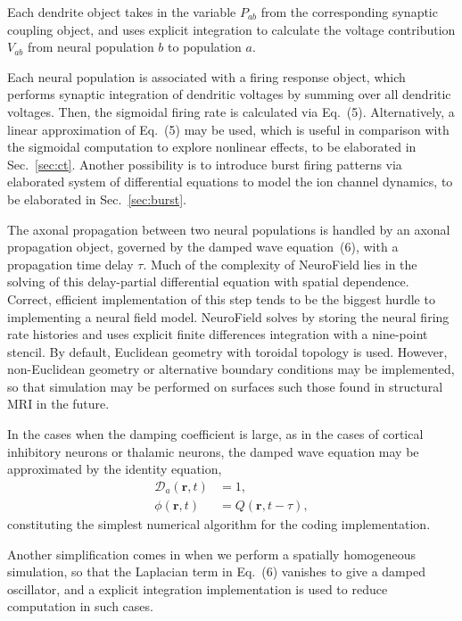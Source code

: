 \documentclass[preprint,review,10pt,authoryear,letterpaper]{elsarticle}
\begin{document}
Each dendrite object takes in the variable \(P_{ab}\) from the corresponding synaptic coupling object, and uses explicit integration to calculate the voltage contribution \(V_{ab}\) from neural population \(b\) to population \(a\).

Each neural population is associated with a firing response object, which performs synaptic integration of dendritic voltages by summing over all dendritic voltages. Then, the sigmoidal firing rate is calculated via Eq.~(5). Alternatively, a linear approximation of Eq.~(5) may be used, which is useful in comparison with the sigmoidal computation to explore nonlinear effects, to be elaborated in Sec.~\ref{sec:ct}. Another possibility is to introduce burst firing patterns via elaborated system of differential equations to model the ion channel dynamics, to be elaborated in Sec.~\ref{sec:burst}.

The axonal propagation between two neural populations is handled by an axonal propagation object, governed by the damped wave equation~(6), with a propagation time delay \(\tau\). Much of the complexity of NeuroField lies in the solving of this delay-partial differential equation with spatial dependence. Correct, efficient implementation of this step tends to be the biggest hurdle to implementing a neural field model. NeuroField solves by storing the neural firing rate histories and uses explicit finite differences integration with a nine-point stencil. By default, Euclidean geometry with toroidal topology is used. However, non-Euclidean geometry or alternative boundary conditions may be implemented, so that simulation may be performed on surfaces such those found in structural MRI in the future.

In the cases when the damping coefficient is large, as in the cases of cortical inhibitory neurons or thalamic neurons, the damped wave equation may be approximated by the identity equation,
\begin{align}
	\mathcal{D}_a(\mathbf{r},t) &= 1,\\
	\phi(\mathbf{r},t) &= Q(\mathbf{r},t-\tau),
\end{align}
constituting the simplest numerical algorithm for the coding implementation.

Another simplification comes in when we perform a spatially homogeneous simulation, so that the Laplacian term in Eq.~(6) vanishes to give a damped oscillator, and a explicit integration implementation is used to reduce computation in such cases.
\end{document}
